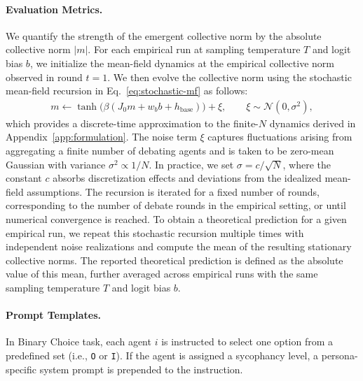 \documentclass{article}
\theoremstyle{plain}
\theoremstyle{definition}
\theoremstyle{remark}
\begin{document}
\paragraph{Evaluation Metrics.}
We quantify the strength of the emergent collective norm by the absolute
collective norm $|m|$.
For each empirical run at sampling temperature $T$ and logit bias $b$,
we initialize the mean-field dynamics at the empirical collective norm observed in round $t=1$.
We then evolve the collective norm using the stochastic mean-field recursion in Eq.~\eqref{eq:stochastic-mf} as follows: 
\begin{align}\label{eq:fitting}
m \leftarrow \tanh\bigl(\beta(J_0 m + w_b b + h_{\text{base}})\bigr) + \xi,
\qquad \xi \sim \mathcal{N}(0,\sigma^2),
\end{align}
which provides a discrete-time approximation to the finite-$N$ dynamics
derived in Appendix~\ref{app:formulation}.
The noise term $\xi$ captures fluctuations arising from aggregating a
finite number of debating agents and is taken to be zero-mean Gaussian
with variance $\sigma^2 \propto 1/N$.
In practice, we set $\sigma = c/\sqrt{N}$, where the constant $c$
absorbs discretization effects and deviations from the idealized
mean-field assumptions. 
The recursion is iterated for a fixed number of rounds, corresponding to
the number of debate rounds in the empirical setting, or until numerical
convergence is reached. 
To obtain a theoretical prediction for a given empirical run, we repeat
this stochastic recursion multiple times with independent noise
realizations and compute the mean of the resulting stationary
collective norms.
The reported theoretical prediction is defined as the absolute value of
this mean, further averaged across empirical runs with the same sampling
temperature $T$ and logit bias $b$.




\paragraph{Prompt Templates. } 
In Binary Choice task, each agent $i$ is instructed to select one option from a predefined set (i.e., \texttt{O} or \texttt{I}). If the agent is assigned a sycophancy level, a persona-specific system prompt is prepended to the instruction.
\end{document}
